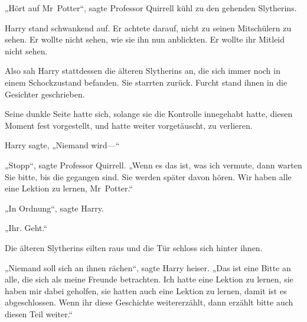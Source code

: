 „Hört auf Mr~Potter“, sagte Professor Quirrell kühl zu den gehenden Slytherins.

Harry stand schwankend auf. Er achtete darauf, nicht zu seinen Mitschülern zu sehen. Er wollte nicht sehen, wie sie ihn nun anblickten. Er wollte ihr Mitleid nicht sehen.

Also sah Harry stattdessen die älteren Slytherins an, die sich immer noch in einem Schockzustand befanden. Sie starrten zurück. Furcht stand ihnen in die Gesichter geschrieben.

Seine dunkle Seite hatte sich, solange sie die Kontrolle innegehabt hatte, diesen Moment fest vorgestellt, und hatte weiter vorgetäuscht, zu verlieren.

Harry sagte, „Niemand wird—“

„Stopp“, sagte Professor Quirrell. „Wenn es das ist, was ich vermute, dann warten Sie bitte, bis die gegangen sind. Sie werden später davon hören. Wir haben alle eine Lektion zu lernen, Mr~Potter.“

„In Ordnung“, sagte Harry.

„Ihr. Geht.“

Die älteren Slytherins eilten raus und die Tür schloss sich hinter ihnen.

„Niemand soll sich an ihnen rächen“, sagte Harry heiser. „Das ist eine Bitte an alle, die sich als meine Freunde betrachten. Ich hatte eine Lektion zu lernen, sie haben mir dabei geholfen, sie hatten auch eine Lektion zu lernen, damit ist es abgeschlossen. Wenn ihr diese Geschichte weitererzählt, dann erzählt bitte auch diesen Teil weiter.“

